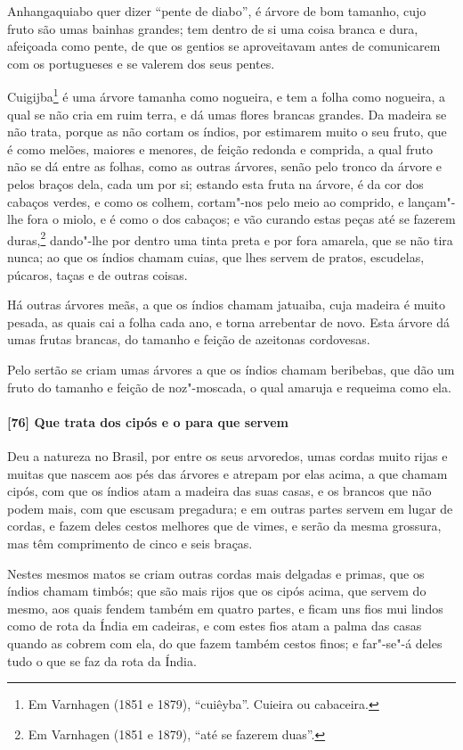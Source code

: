 Anhangaquiabo quer dizer ``pente de diabo'', é árvore de bom tamanho, cujo fruto são umas
bainhas grandes; tem dentro de si uma coisa branca e dura, afeiçoada como pente, de que os
gentios se aproveitavam antes de comunicarem com os portugueses e se valerem dos seus
pentes.

Cuigijba\footnote{ Em Varnhagen (1851 e 1879), ``cuiêyba''. Cuieira ou cabaceira.} é uma
árvore tamanha como nogueira, e tem a folha como nogueira, a qual se não cria em ruim
terra, e dá umas flores brancas grandes. Da madeira se não trata, porque as não cortam os
índios, por estimarem muito o seu fruto, que é como melões, maiores e menores, de feição
redonda e comprida, a qual fruto não se dá entre as folhas, como as outras árvores, senão
pelo tronco da árvore e pelos braços dela, cada um por si; estando esta fruta na árvore, é
da cor dos cabaços verdes, e como os colhem, cortam"-nos pelo meio ao comprido, e
lançam"-lhe fora o miolo, e é como o dos cabaços; e vão curando estas peças até se fazerem
duras,\footnote{ Em Varnhagen (1851 e 1879), ``até se fazerem duas''.} dando"-lhe por
dentro uma tinta preta e por fora amarela, que se não tira nunca; ao que os índios chamam
cuias, que lhes servem de pratos, escudelas, púcaros, taças e de outras coisas.

Há outras árvores meãs, a que os índios chamam jatuaiba, cuja madeira é muito pesada, as
quais cai a folha cada ano, e torna arrebentar de novo. Esta árvore dá umas frutas
brancas, do tamanho e feição de azeitonas cordovesas.

Pelo sertão se criam umas árvores a que os índios chamam beribebas, que dão um fruto do
tamanho e feição de noz"-moscada, o qual amaruja e requeima como ela.

\paragraph{[76] Que trata dos cipós e o para que servem}\quad
Deu a natureza no Brasil, por entre os seus arvoredos, umas cordas muito rijas e muitas
que nascem aos pés das árvores e atrepam por elas acima, a que chamam cipós, com que os
índios atam a madeira das suas casas, e os brancos que não podem mais, com que escusam
pregadura; e em outras partes servem em lugar de cordas, e fazem deles cestos melhores que
de vimes, e serão da mesma grossura, mas têm comprimento de cinco e seis braças.

Nestes mesmos matos se criam outras cordas mais delgadas e primas, que os índios chamam
timbós; que são mais rijos que os cipós acima, que servem do mesmo, aos quais fendem
também em quatro partes, e ficam uns fios mui lindos como de rota da Índia em cadeiras, e
com estes fios atam a palma das casas quando as cobrem com ela, do que fazem também cestos
finos; e far"-se"-á deles tudo o que se faz da rota da Índia.

